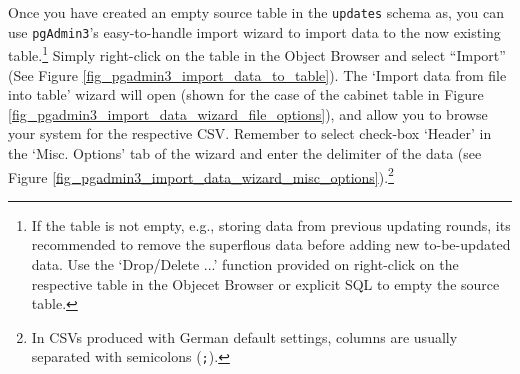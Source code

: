Once you have created an empty source table in the \texttt{updates} schema as, you can use \texttt{pgAdmin3}'s easy-to-handle import wizard to import data to the now existing table.\footnote{%
If the table is not empty, e.g., storing data from previous updating rounds, its recommended to remove the superflous data before adding new to-be-updated data. 
Use the `Drop/Delete ...' function provided on right-click on the respective table in the Objecet Browser or explicit SQL to empty the source table.}
Simply right-click on the table in the Object Browser and select ``Import'' (See Figure \ref{fig_pgadmin3_import_data_to_table}). 
The `Import data from file into table' wizard will open (shown for the case of the cabinet table in Figure \ref{fig_pgadmin3_import_data_wizard_file_options}), and allow you to browse your system for the respective CSV. 
Remember to select check-box `Header' in the `Misc. Options' tab of the wizard and enter the delimiter of the data (see Figure \ref{fig_pgadmin3_import_data_wizard_misc_options}).\footnote{In CSVs produced with German default settings, columns are usually separated with semicolons (\texttt{;}).}

